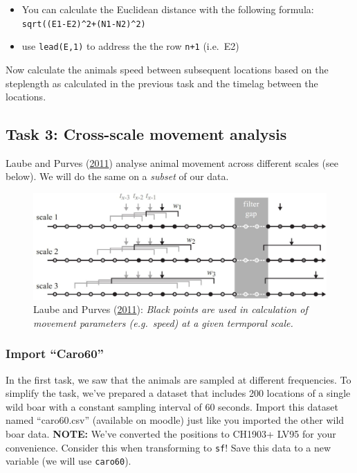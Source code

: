 \documentclass[]{book}
\providecommand{\tightlist}{%
  \setlength{\itemsep}{0pt}\setlength{\parskip}{0pt}}
\begin{document}
\begin{itemize}
\tightlist
\item
  You can calculate the Euclidean distance with the following formula:
  \texttt{sqrt((E1-E2)\^{}2+(N1-N2)\^{}2)}
\item
  use \texttt{lead(E,1)} to address the the row \texttt{n+1} (i.e.~E2)
\end{itemize}

Now calculate the animals speed between subsequent locations based on
the steplength as calculated in the previous task and the timelag
between the locations.

\subsection{Task 3: Cross-scale movement
analysis}\label{task-3-cross-scale-movement-analysis}

Laube and Purves (\protect\hyperlink{ref-laube2011}{2011}) analyse
animal movement across different scales (see below). We will do the same
on a \emph{subset} of our data.

\begin{figure}
\centering
\includegraphics{02_Images/laube_2011_2.jpg}
\caption{Laube and Purves (\protect\hyperlink{ref-laube2011}{2011}):
\emph{Black points are used in calculation of movement parameters
(e.g.~speed) at a given termporal scale.}}
\end{figure}

\subsubsection{\texorpdfstring{Import
``Caro60''}{Import Caro60}}\label{import-caro60}

In the first task, we saw that the animals are sampled at different
frequencies. To simplify the task, we've prepared a dataset that
includes 200 locations of a single wild boar with a constant sampling
interval of 60 seconds. Import this dataset named ``caro60.csv''
(available on moodle) just like you imported the other wild boar data.
\textbf{NOTE:} We've converted the positions to CH1903+ LV95 for your
convenience. Consider this when transforming to \texttt{sf}! Save this
data to a new variable (we will use \texttt{caro60}).
\end{document}
